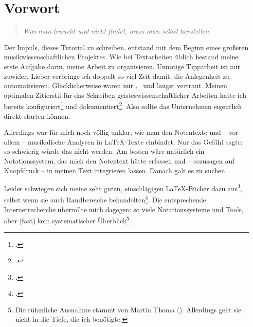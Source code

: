 %
%
%



\section{Vorwort}

\begin{quote}\textit{Was man braucht und nicht findet, muss man selbst herstellen.}
\end{quote}

Der Impuls, dieses Tutorial zu schreiben, entstand mit dem Beginn eines größeren
musikwissenschaftlichen Projektes. Wie bei Textarbeiten üblich bestand meine
erste Aufgabe darin, meine Arbeit zu organisieren. Unnötige Tipparbeit ist mir
zuwider. Lieber verbringe ich doppelt so viel Zeit damit, die Anlegenheit zu
automatisieren. Glücklicherweise waren mir \acc{\LaTeX}, \ und
 längst vertraut. Meinen optimalen Zitierstil für das Schreiben
geisteswissenschaftlicher Arbeiten hatte ich bereits
konfiguriert\footcite[vgl.][\nopage wp]{Reincke2018a} und
dokumentiert\footcite[vgl][2ff]{Reincke2018b}. Also sollte das Unternehmen
eigentlich direkt starten können.

Allerdings war für mich noch völlig unklar, wie man den Notentexte und -- vor
allem -- musikalische Analysen in \LaTeX-Texte einbindet. Nur das Gefühl sagte:
so schwierig würde das nicht werden. Am besten wäre natürlich ein
No\-ta\-tions\-system, das mich den Notentext hätte erfassen und -- sozusagen auf
Knopfdruck -- in meinen Text integrieren lassen. Danach galt es zu suchen.

Leider schwiegen sich meine sehr guten, einschlägigen \LaTeX-Bücher dazu
aus\footcite[ vgl.][vi ff, insbesondere 905 u. 909: das umfangreiche Register
erwähnt weder Musik im allgemeinen noch LilyPond oder MusiX\TeX im
Besonderen]{Voss2012a}, selbst wenn sie auch Randbereiche
behandelten\footcite[vgl.][vii ff, insbesondere 1080 u.
1087: auch dieses umfangreiche Register erwähnt weder Musik im allgemeinen noch
LilyPond oder MusiX\TeX im Besonderen.]{MitGoo2005a}. Die entsprechende
Internetrecherche überrollte mich dagegen: so viele Notationssysteme und Tools,
aber (fast) kein systematischer Überblick\footnote{Die rühmliche Ausnahme stammt
von Martin Thoma (\cite[vgl.][\nopage wp]{Thoma2018a}). Allerdings geht sie
nicht in die Tiefe, die ich benötigte.}.

